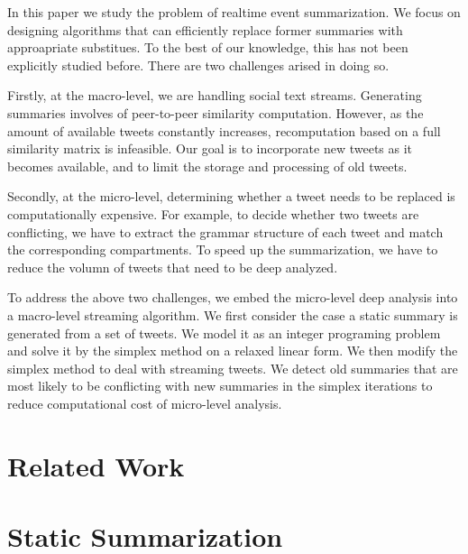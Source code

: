 \documentclass{article}
\begin{document}
In this paper we study the problem of realtime event summarization. We focus on designing algorithms that can efficiently replace former summaries with approapriate substitues. To the best of our knowledge, this has not been explicitly studied before. There are two challenges arised in doing so.

Firstly, at the macro-level, we are handling social text streams. Generating summaries involves of peer-to-peer similarity computation. However, as the amount of available tweets constantly increases, recomputation based on a full similarity matrix is infeasible. Our goal is to incorporate new tweets as it becomes available, and to limit the storage and processing of old tweets. 

Secondly, at the micro-level, determining whether a tweet needs to be replaced is computationally expensive. For example, to decide whether two tweets are conflicting, we have to extract the grammar structure of each tweet and match the corresponding compartments. To speed up the summarization, we have to reduce the volumn of tweets that need to be deep analyzed.   

To address the above two challenges, we embed the micro-level deep analysis into a macro-level streaming algorithm. We first consider the case a static summary is generated from a set of tweets. We model it as an integer programing problem and solve it by the simplex method on a relaxed linear form. We then modify the simplex method to deal with streaming tweets. We detect old summaries that are most likely to be conflicting with new summaries in the simplex iterations to reduce computational cost of micro-level analysis. 



\section{Related Work}

\section{Static Summarization}
\end{document}
